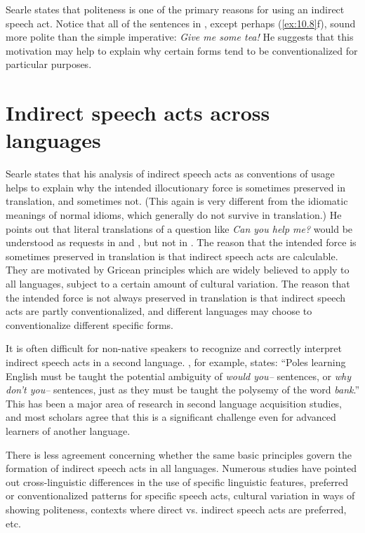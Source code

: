 Searle states that politeness is one of the primary reasons for using an indirect speech act. Notice that all of the sentences in , except perhaps (\ref{ex:10.8}f), sound more polite than the simple imperative: \textit{Give me some tea!} He suggests that this motivation may help to explain why certain forms tend to be conventionalized for particular purposes.



\section{Indirect speech acts across languages}\label{sec:10.4}

Searle states that his analysis of indirect speech acts as conventions of usage helps to explain why the intended illocutionary force is sometimes preserved in translation, and sometimes not. (This again is very different from the idiomatic meanings of normal idioms, which generally do not survive in translation.) He points out that literal translations of a question like \textit{Can you help me?} would be understood as requests in  and , but not in . The reason that the intended force is sometimes preserved in translation is that indirect speech acts are calculable. They are motivated by Gricean principles which are widely believed to apply to all languages, subject to a certain amount of cultural variation. The reason that the intended force is not always preserved in translation is that indirect speech acts are partly conventionalized, and different languages may choose to conventionalize different specific forms.



It is often difficult for non-native speakers to recognize and correctly interpret indirect speech acts in a second language. \citet[175]{Wierzbicka1985}, for example, states: “Poles learning English must be taught the potential ambiguity of \textit{would you–} sentences, or \textit{why don’t you–} sentences, just as they must be taught the polysemy of the word \textit{bank}.” This has been a major area of research in second language acquisition studies, and most scholars agree that this is a significant challenge even for advanced learners of another language.



There is less agreement concerning whether the same basic principles govern the formation of indirect speech acts in all languages. Numerous studies have pointed out cross-linguistic differences in the use of specific linguistic features, preferred or conventionalized patterns for specific speech acts, cultural variation in ways of showing politeness, contexts where direct vs. indirect speech acts are preferred, etc.



